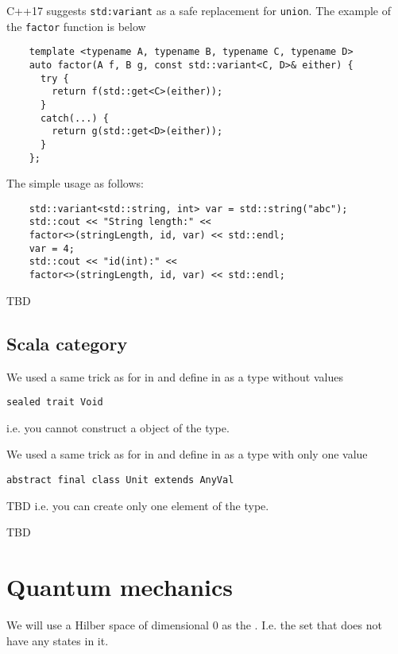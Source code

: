 \begin{example}[Sum][\textbf{C++}]
  C++17 suggests \texttt{std:variant} as a safe replacement
  for \texttt{union}. The example of the \texttt{factor}
  function is below
  \begin{verbatim}
    template <typename A, typename B, typename C, typename D>
    auto factor(A f, B g, const std::variant<C, D>& either) {
      try {
        return f(std::get<C>(either));               
      }
      catch(...) {
        return g(std::get<D>(either));                              
      }
    };
  \end{verbatim}
  The simple usage as follows:
  \begin{verbatim}
    std::variant<std::string, int> var = std::string("abc");
    std::cout << "String length:" <<
    factor<>(stringLength, id, var) << std::endl;
    var = 4;
    std::cout << "id(int):" <<
    factor<>(stringLength, id, var) << std::endl;    
  \end{verbatim}

\end{example}
TBD
\subsection{\textbf{Scala} category}
\begin{example}
\label{ex:scala_initial_object}
We used a same trick as for  in
 and define
 in  as a
type without values 
\begin{verbatim}
sealed trait Void
\end{verbatim}
i.e. you cannot construct a object of the type.
\end{example}

\begin{example}
\label{ex:scala_terminal_object}
We used a same trick as for 
in  and define
 in  as a
type with only one value
\begin{verbatim}
abstract final class Unit extends AnyVal
\end{verbatim}
TBD
i.e. you can create only one element of the type.
\end{example}

TBD

\section{Quantum mechanics}
\begin{example}
\label{ex:quant_initial_object}
We will use a Hilber space of dimensional 0 as the
. I.e. the set that does not have any
states in it.
\end{example}

